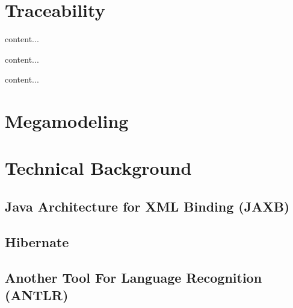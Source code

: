 \section{Traceability}
\cite{DBLP:books/daglib/p/GotelCHZEGDAMM12}

\begin{definition}[Trace]
content...
\end{definition}

\begin{definition}
content...
\end{definition}


\begin{definition}
content...
\end{definition}


\section{Megamodeling}
\cite{DBLP:conf/sattose/BaggeZ14}
\cite{DBLP:journals/entcs/FavreN05}

\subsection{\megal}
\cite{DBLP:conf/ecmdafa/LammelV14}
\cite{DBLP:conf/models/FavreLV12}
\cite{DBLP:conf/sle/Lammel16}

\subsection{\megalxtext}
\cite{LukasHaertelBScThesis}



\section{Technical Background}

\subsection{Java Architecture for XML Binding (JAXB)}

\subsection{Hibernate}

\subsection{Another Tool For Language Recognition (ANTLR)}
\cite{Parr:2013:DAR:2501720}

